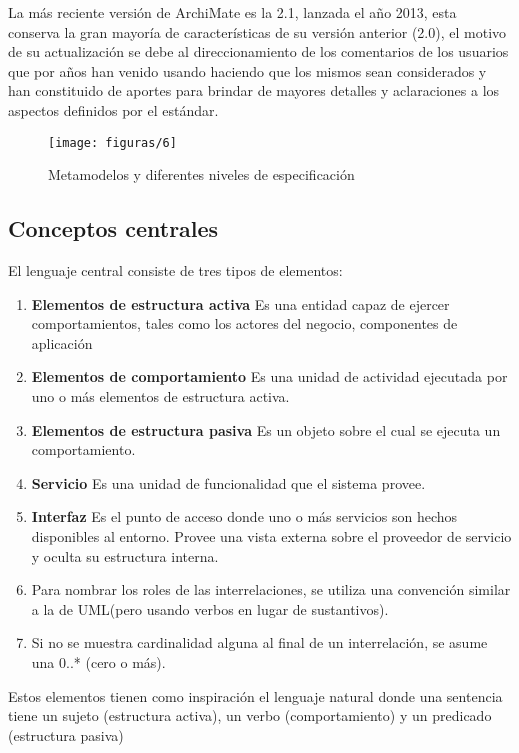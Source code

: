   La más reciente versión de ArchiMate es la 2.1, lanzada el año 2013, esta conserva la gran mayoría de características de su versión anterior (2.0), el motivo de su actualización se debe al direccionamiento de los comentarios de los usuarios que por años han venido usando haciendo que los mismos sean considerados y han constituido de aportes para brindar de mayores detalles y aclaraciones a los aspectos definidos por el estándar.
  
 \begin{figure}[H]
   	\centering
   	\texttt{[image: figuras/6]}
   	\captionsetup{width=.95\textwidth}
   	\caption{Metamodelos y diferentes niveles de especificación}
   	\label{figura6}
 \end{figure}
  
  \subsection{Conceptos centrales}
  El lenguaje central consiste de tres tipos de elementos:
  \begin{enumerate}
  	\item \textbf{Elementos de estructura activa} Es una entidad capaz de ejercer comportamientos, tales como los actores del negocio, componentes de aplicación
  	\item \textbf{Elementos de comportamiento} Es una unidad de actividad ejecutada por uno o más elementos de estructura activa.
  	\item \textbf{Elementos de estructura pasiva} Es un objeto sobre el cual se ejecuta un comportamiento.
  	\item \textbf{Servicio} Es una unidad de funcionalidad que el sistema provee.
  	\item \textbf{Interfaz} Es el punto de acceso donde uno o más servicios son hechos disponibles al entorno. Provee una vista externa sobre el proveedor de servicio y oculta su estructura interna.
  	\item Para nombrar los roles de las interrelaciones, se utiliza una convención similar a la de UML(pero usando verbos en lugar de sustantivos).
  	\item Si no se muestra cardinalidad alguna al final de un interrelación, se asume una 0..* (cero o más).
  \end{enumerate}

  Estos elementos tienen como inspiración el lenguaje natural donde una sentencia tiene un sujeto (estructura activa), un verbo (comportamiento) y un predicado (estructura pasiva)
  

